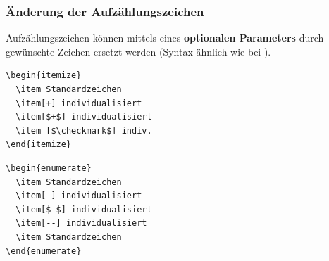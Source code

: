 \begin{frame}[fragile]
\frametitle{Änderung der Aufzählungszeichen}

\noindent Aufzählungszeichen können mittels eines \textbf{optionalen Parameters} durch gewünschte Zeichen ersetzt werden (Syntax ähnlich wie bei ).

\begin{multicols}{2}

\begin{lstlisting}
\begin{itemize}
  \item Standardzeichen
  \item[+] individualisiert
  \item[$+$] individualisiert
  \item [$\checkmark$] indiv.
\end{itemize}
\end{lstlisting}

\columnbreak{}

\end{multicols}

\begin{multicols}{2}

\begin{lstlisting}
\begin{enumerate}
  \item Standardzeichen
  \item[-] individualisiert
  \item[$-$] individualisiert
  \item[--] individualisiert
  \item Standardzeichen
\end{enumerate}
\end{lstlisting}

\columnbreak{}


\end{multicols}

\end{frame}


